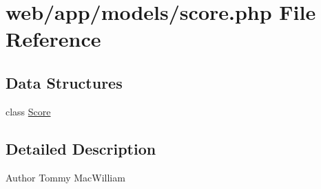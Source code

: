 \hypertarget{score_8php}{
\section{web/app/models/score.php File Reference}
\label{score_8php}
}
\subsection*{Data Structures}
\begin{DoxyCompactItemize}
\item 
class \hyperlink{class_score}{Score}
\end{DoxyCompactItemize}


\subsection{Detailed Description}
\begin{DoxyAuthor}{Author}
Tommy MacWilliam 
\end{DoxyAuthor}

